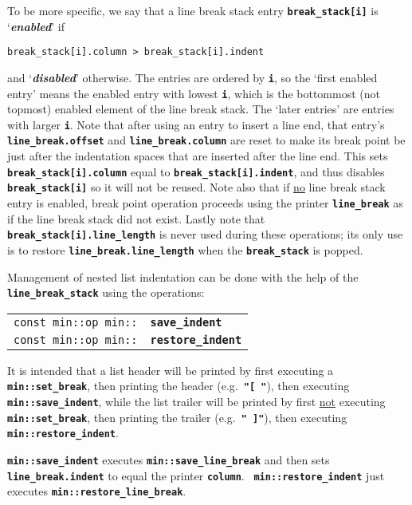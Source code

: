 \documentclass[12pt]{article}
\makeatletter
\newcommand{\TT}[1]{{\tt \bfseries #1}}
\newcommand{\key}[1]{{\bf \em #1}\index{#1}}
\newcommand{\ttindex}[1]{\index{#1@{\tt #1}}}
\newcommand{\EOL}{\penalty \exhyphenpenalty}
\newenvironment{indpar}[1][0.3in]%
	{\begin{list}{}%
		     {\setlength{\itemsep}{0in}%
		      \setlength{\topsep}{0in}%
		      \setlength{\parsep}{1ex}%
		      \setlength{\labelwidth}{#1}%
		      \setlength{\leftmargin}{#1}%
		      \addtolength{\leftmargin}{\labelsep}}%
	 \item}%
	{\end{list}}
\newcommand{\LABEL}[1]{\label{#1}}
\newcommand{\MINKEY}[1]%
	   {\TT{#1}\ttindex{min::#1}\ttindex{#1}}
\makeatother
\begin{document}
To be more specific, we say that a line break stack
entry \TT{break\_\EOL stack[i]} is `\key{enabled}' if
\begin{center}
\tt break\_stack[i].column > break\_stack[i].indent
\end{center}
and `\key{disabled}' otherwise.  The entries are ordered by \TT{i},
so the `first enabled entry' means the enabled entry with lowest \TT{i},
which is the bottommost (not topmost) enabled element of the line break stack.
The `later entries' are entries with larger \TT{i}.  Note that
after using an entry to insert a line end, that entry's
\TT{line\_\EOL break.offset}
and \TT{line\_\EOL break.column} are reset to make its break point
be just after the indentation spaces that are inserted after the line end.
This sets \TT{break\_\EOL stack[i].column}
equal to \TT{break\_\EOL stack[i].indent},
and thus disables \TT{break\_\EOL stack[i]} so it will not be reused.
Note also that if \underline{no} line break stack entry is enabled,
break point operation proceeds using the printer \TT{line\_\EOL break}
as if the line break stack did not exist.
Lastly note that \TT{break\_\EOL stack[i].line\_\EOL length} is never
used during these operations; its only use is to restore 
\TT{line\_\EOL break.line\_\EOL length} when the \TT{break\_\EOL stack}
is popped.


Management of nested list indentation can be done with the help of
the \TT{line\_\EOL break\_\EOL stack} using the operations:

\begin{indpar}[1em]\begin{tabular}{r@{}l}
\verb|const min::op min::|
    & \MINKEY{save\_indent}
\LABEL{MIN::SAVE_INDENT} \\
\verb|const min::op min::|
    & \MINKEY{restore\_indent}
\LABEL{MIN::RESTORE_INDENT} \\
\end{tabular}\end{indpar}

It is intended that a list header will be printed by first
executing a \TT{min::\EOL set\_\EOL break}, then printing the
header (e.g.~\TT{"[ "}), then executing
\TT{min::save\_indent}, while the list trailer will be printed
by first \underline{not} executing \TT{min::\EOL set\_\EOL break},
then printing the trailer (e.g.~\TT{" ]"}), then executing
\TT{min::\EOL restore\_\EOL indent}.

\TT{min::save\_indent} executes
\TT{min::\EOL save\_\EOL line\_\EOL break} and then
sets \TT{line\_\EOL break.indent} to equal the printer
\TT{column}.
~\TT{min::restore\_\EOL indent} just
executes \TT{min::\EOL restore\_\EOL line\_\EOL break}.
\end{document}
